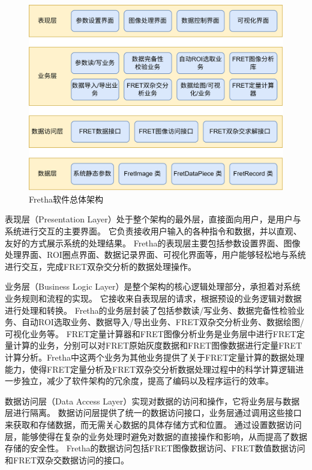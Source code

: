 \begin{figure}[hbtp]
    \centering
    \includegraphics[width=1\linewidth]{../figures/2/2_Fretha软件架构图.png}
    \caption{Fretha软件总体架构}
    \label{fig:fretha_arch}
\end{figure}

表现层（Presentation Layer）处于整个架构的最外层，直接面向用户，是用户与系统进行交互的主要界面。
它负责接收用户输入的各种指令和数据，并以直观、友好的方式展示系统的处理结果。
Fretha的表现层主要包括参数设置界面、图像处理界面、ROI圈点界面、数据记录界面、可视化界面等，用户能够轻松地与系统进行交互，完成FRET双杂交分析的数据处理操作。

业务层（Business Logic Layer）是整个架构的核心逻辑处理部分，承担着对系统业务规则和流程的实现。
它接收来自表现层的请求，根据预设的业务逻辑对数据进行处理和转换。
Fretha的业务层封装了包括参数读/写业务、数据完备性检验业务、自动ROI选取业务、数据导入/导出业务、FRET双杂交分析业务、数据绘图/可视化业务等。
FRET定量计算器和FRET图像分析业务是业务层中进行FRET定量计算的业务，分别可以对FRET原始灰度数据和FRET图像数据进行定量FRET计算分析。Fretha中这两个业务为其他业务提供了关于FRET定量计算的数据处理能力，使得FRET定量分析及FRET双杂交分析数据处理过程中的科学计算逻辑进一步独立，减少了软件架构的冗余度，提高了编码以及程序运行的效率。

数据访问层（Data Access Layer）实现对数据的访问和操作，它将业务层与数据层进行隔离。
数据访问层提供了统一的数据访问接口，业务层通过调用这些接口来获取和存储数据，而无需关心数据的具体存储方式和位置。
通过设置数据访问层，能够使得在复杂的业务处理时避免对数据的直接操作和影响，从而提高了数据存储的安全性。
Fretha的数据访问包括FRET图像数据访问、FRET数值数据访问和FRET双杂交数据访问的接口。

